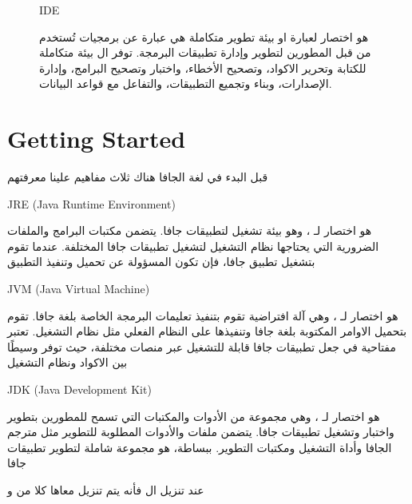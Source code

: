 \begin{figure}[b]
  \begin{enrichment*}{IDE }
    \begin{AR}
       هو اختصار لعبارة  او بيئة تطوير متكاملة هي عبارة عن برمجيات تُستخدم من قبل المطورين لتطوير وإدارة تطبيقات البرمجة. توفر ال بيئة متكاملة للكتابة وتحرير الاكواد، وتصحيح الأخطاء، واختبار وتصحيح البرامج، وإدارة الإصدارات، وبناء وتجميع التطبيقات، والتفاعل مع قواعد البيانات.
    \end{AR}
  \end{enrichment*}
\end{figure}
  \newpage
  \section{Getting Started}
  \begin{AR}
    قبل البدء في لغة الجافا هناك ثلاث مفاهيم علينا معرفتهم
  \end{AR}

  \begin{definition}{JRE (Java Runtime Environment)}
    \begin{AR}
      هو اختصار لـ ، وهو بيئة تشغيل لتطبيقات جافا. يتضمن  مكتبات البرامج والملفات الضرورية التي يحتاجها نظام التشغيل لتشغيل تطبيقات جافا المختلفة. عندما تقوم بتشغيل تطبيق جافا، فإن  تكون المسؤولة عن تحميل وتنفيذ التطبيق
    \end{AR}
  \end{definition}

  \begin{definition}{JVM (Java Virtual Machine)}
    \begin{AR}
       هو اختصار لـ ، وهي آلة افتراضية تقوم بتنفيذ تعليمات البرمجة الخاصة بلغة جافا. تقوم  بتحميل الاوامر المكتوبة بلغة جافا وتنفيذها على النظام الفعلي \LR{)}مثل نظام التشغيل\LR{(}. تعتبر  مفتاحية في جعل تطبيقات جافا قابلة للتشغيل عبر منصات مختلفة، حيث توفر وسيطًا بين الاكواد ونظام التشغيل
    \end{AR}
  \end{definition}

  \begin{definition}{JDK (Java Development Kit)}
    \begin{AR}
       هو اختصار لـ ، وهي مجموعة من الأدوات والمكتبات التي تسمح للمطورين بتطوير واختبار وتشغيل تطبيقات جافا. يتضمن  ملفات  والأدوات المطلوبة للتطوير مثل مترجم الجافا  وأداة التشغيل  ومكتبات التطوير. ببساطة،  هو مجموعة شاملة لتطوير تطبيقات جافا
    \end{AR}
  \end{definition}
  \begin{AR}
    عند تنزيل ال  فأنه يتم تنزيل معاها كلا من  و  
  \end{AR}
